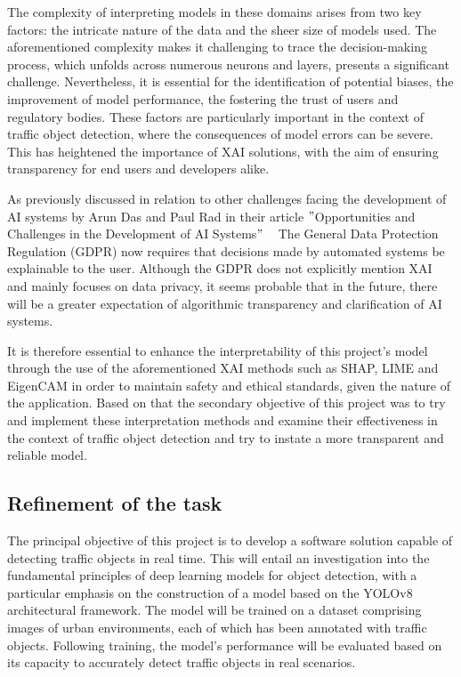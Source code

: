 The complexity of interpreting models in these domains arises from two key factors: the intricate nature of the data and the sheer size of models used.
The aforementioned complexity makes it challenging to trace the decision-making process, which unfolds across numerous neurons and layers,
presents a significant challenge.
Nevertheless, it is essential for the identification of potential biases, the improvement of model performance, the fostering the trust of users and regulatory bodies.
These factors are particularly important in the context of traffic object detection, where the consequences of model errors can be severe.
This has heightened the importance of XAI solutions, with the aim of ensuring transparency for end users and developers alike.

As previously discussed in relation to other challenges facing the development of AI systems by Arun Das and Paul Rad in their article
\("\)Opportunities and Challenges in the Development of AI Systems\("\) ~\cite{das2020opportunitieschallengesexplainableartificial}
The General Data Protection Regulation (GDPR) now requires that decisions made by automated systems be
explainable to the user.
Although the GDPR does not explicitly mention XAI and mainly focuses on data privacy,
it seems probable that in the future, there will be a greater expectation of algorithmic transparency and clarification of AI systems.

It is therefore essential to enhance the interpretability of this project's model through the use of the aforementioned
XAI methods such as SHAP, LIME and EigenCAM in order to maintain safety and ethical standards, given the nature of the
application.
Based on that the secondary objective of this project was to try and implement these interpretation methods and examine their
effectiveness in the context of traffic object detection and try to instate a more transparent and reliable model.

\subsection{Refinement of the task}\label{subsec:Refinement-of-the-task} %


The principal objective of this project is to develop a software solution capable of detecting traffic objects in real time.
This will entail an investigation into the fundamental principles of deep learning models for object detection, with a
particular emphasis on the construction of a model based on the YOLOv8 architectural framework.
The model will be trained on a dataset comprising images of urban environments, each of which has been annotated with
traffic objects.
Following training, the model's performance will be evaluated based on its capacity to accurately detect traffic objects
in real scenarios.

